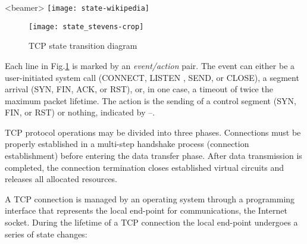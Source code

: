 
\begin{frame}<beamer>
  \centering
  \texttt{[image: state-wikipedia]}
\end{frame}

\begin{figure}[!ht]
  \centering
  \texttt{[image: state\_stevens-crop]}
  \caption{TCP state transition diagram\label{fig:state}}
\end{figure}

Each line in Fig.\ref{fig:state} is marked by an \emph{event/action} pair. The event can
either be a user-initiated system call (CONNECT, LISTEN , SEND, or CLOSE), a segment
arrival (SYN, FIN, ACK, or RST), or, in one case, a timeout of twice the maximum packet
lifetime. The action is the sending of a control segment (SYN, FIN, or RST) or nothing,
indicated by --.

 TCP protocol operations may be divided
into three phases. Connections must be properly established in a multi-step handshake
process (connection establishment) before entering the data transfer phase. After data
transmission is completed, the connection termination closes established virtual circuits
and releases all allocated resources.

A TCP connection is managed by an operating system through a programming interface that
represents the local end-point for communications, the Internet socket. During the
lifetime of a TCP connection the local end-point undergoes a series of state
changes:

